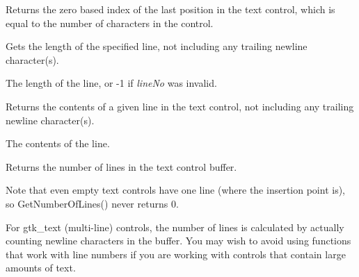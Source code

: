\label{wxtextctrlgetlastposition}


Returns the zero based index of the last position in the text control,
which is equal to the number of characters in the control.

\label{wxtextctrlgetlinelength}


Gets the length of the specified line, not including any trailing newline
character(s).




The length of the line, or -1 if {\it lineNo} was invalid.

\label{wxtextctrlgetlinetext}


Returns the contents of a given line in the text control, not including
any trailing newline character(s).




The contents of the line.

\label{wxtextctrlgetnumberoflines}


Returns the number of lines in the text control buffer.


Note that even empty text controls have one line (where the insertion point
is), so GetNumberOfLines() never returns 0.

For gtk\_text (multi-line) controls, the number of lines is
calculated by actually counting newline characters in the buffer. You
may wish to avoid using functions that work with line numbers if you are
working with controls that contain large amounts of text.

\label{wxtextctrlgetselection}

